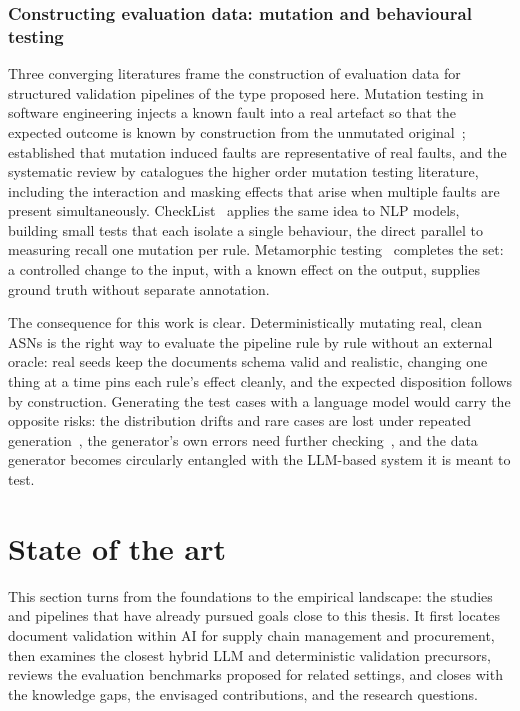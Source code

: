 \subsubsection{Constructing evaluation data: mutation and behavioural testing}
\label{sec:lr:eval:mutation}

Three converging literatures frame the construction of evaluation data for
structured validation pipelines of the type proposed here. Mutation testing in software engineering injects a known fault into a real artefact so that the
expected outcome is known by construction from the
unmutated original~\citep{jiaharman2011,papadakis2019}; \citet{andrews2005} established
that mutation induced faults are representative of real faults, and
the systematic review by \citet{ghiduk2017} catalogues the higher order mutation testing literature,
including the interaction and masking effects that arise when multiple faults are present
simultaneously. CheckList~\citep{ribeiro2020} applies the same idea to NLP models, building small tests that each isolate a single behaviour, the direct parallel to measuring recall one mutation per rule. Metamorphic testing~\citep{segura2016} completes the set: a controlled change to the input, with a known effect on the output, supplies ground truth without separate annotation.

The consequence for this work is clear. Deterministically mutating real, clean ASNs is the right way to evaluate the pipeline rule by rule without an external oracle: real seeds keep the documents schema valid and realistic, changing one thing at a time pins each rule's effect cleanly, and the expected disposition follows by construction. Generating the test cases with a language model would carry the opposite risks: the distribution drifts and rare cases are lost under repeated generation~\citep{shumailov2024}, the generator's own errors need further checking~\citep{nadas2025}, and the data generator becomes circularly entangled with the LLM-based system it is meant to test.


\section{State of the art}
\label{sec:lr:sota}

This section turns from the foundations to the empirical landscape: the studies and pipelines that have already pursued goals close to this thesis. It first locates document validation within AI for supply chain management and procurement, then examines the closest hybrid LLM and deterministic validation precursors, reviews the evaluation benchmarks proposed for related settings, and closes with the knowledge gaps, the envisaged contributions, and the research questions.



